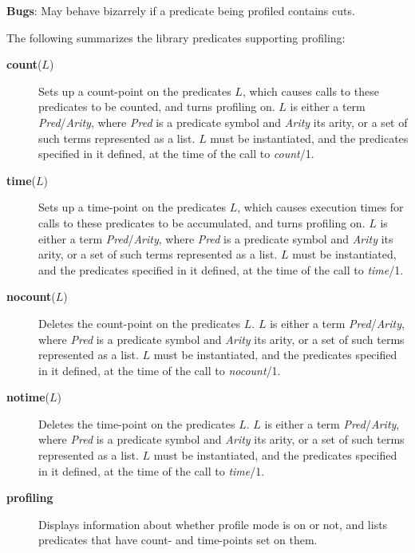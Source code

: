 {\bf Bugs}: May behave bizarrely if a predicate being profiled contains cuts.

The following summarizes the library predicates supporting profiling:

\begin{description}
\item[{\bf count}($L$)] 
    Sets up a count-point on the predicates $L$, which causes calls to
    these predicates to be counted, and turns profiling on.
    $L$ is either
    a term {\em Pred}/{\em Arity}, where {\em Pred} is a predicate
    symbol and {\em Arity} its arity,
    or a set of such terms represented as a list.
    $L$ must be instantiated, and the predicates specified in it defined, at
    the time of the call to {\em count}/1.

\item[{\bf time}($L$)] 
    Sets up a time-point on the predicates $L$, which causes execution times
    for calls to these predicates to be accumulated, and turns profiling on.
    $L$ is either a term {\em Pred}/{\em Arity}, where {\em Pred} is a predicate
    symbol and {\em Arity} its arity,
    or a set of such terms represented as a list.
    $L$ must be instantiated, and the predicates specified in it defined, at
    the time of the call to {\em time}/1.

\item[{\bf nocount}($L$)] 
    Deletes the count-point on the predicates $L$.
    $L$ is either a term {\em Pred}/{\em Arity}, where {\em Pred} is a predicate
    symbol and {\em Arity} its arity,
    or a set of such terms represented as a list.
    $L$ must be instantiated, and the predicates specified in it defined, at
    the time of the call to {\em nocount}/1.

\item[{\bf notime}($L$)] 
    Deletes the time-point on the predicates $L$.
    $L$ is either a term {\em Pred}/{\em Arity}, where {\em Pred} is a predicate
    symbol and {\em Arity} its arity, or a set of such terms represented as a
    list.
    $L$ must be instantiated, and the predicates specified in it defined, at
    the time of the call to {\em time}/1.

\item[{\bf profiling}] 
    Displays information about whether profile mode is on or not, and lists
    predicates that have count- and time-points set on them.


\end{description}
